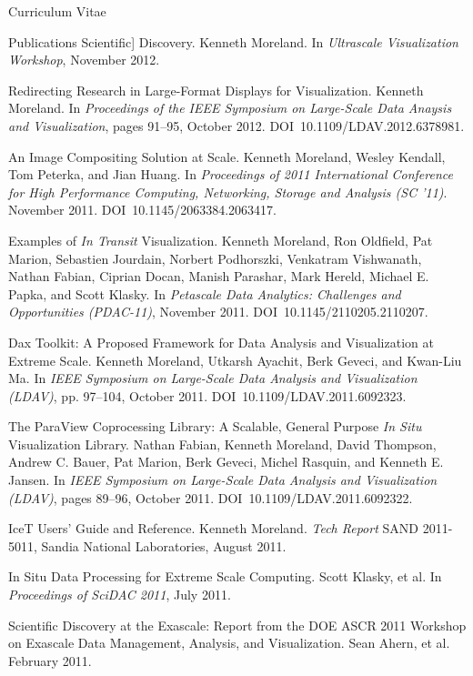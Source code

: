 \documentclass{article}
\begin{document}
\begin{cv}{Curriculum Vitae}
\begin{cvlist}{Publications}
      Scientific] Discovery.  Kenneth Moreland.  In \emph{Ultrascale
      Visualization Workshop}, November 2012.
    \item[Redirecting Research in Large-Format Displays for Visualization.]
      Kenneth Moreland. In \emph{Proceedings of the IEEE Symposium on
        Large-Scale Data Anaysis and Visualization}, pages 91--95, October
      2012. DOI~10.1109/LDAV.2012.6378981.
    \item[An Image Compositing Solution at Scale.] Kenneth Moreland, Wesley
      Kendall, Tom Peterka, and Jian Huang. In \emph{Proceedings of 2011
        International Conference for High Performance Computing,
        Networking, Storage and Analysis (SC '11)}. November
      2011. DOI~10.1145/2063384.2063417.
    \item[Examples of \emph{In Transit} Visualization.] Kenneth Moreland,
      Ron Oldfield, Pat Marion, Sebastien Jourdain, Norbert Podhorszki,
      Venkatram Vishwanath, Nathan Fabian, Ciprian Docan, Manish Parashar,
      Mark Hereld, Michael E. Papka, and Scott Klasky. In \emph{Petascale
        Data Analytics: Challenges and Opportunities (PDAC-11)}, November
      2011. DOI~10.1145/2110205.2110207.
    \item[Dax Toolkit: A Proposed Framework for Data Analysis and
      Visualization at] Extreme Scale. Kenneth Moreland, Utkarsh Ayachit,
      Berk Geveci, and Kwan-Liu Ma. In \emph{IEEE Symposium on Large-Scale
        Data Analysis and Visualization (LDAV)}, pp. 97--104, October
      2011. DOI~10.1109/LDAV.2011.6092323.
    \item[The ParaView Coprocessing Library: A Scalable, General Purpose
      \emph{In Situ}] Visualization Library. Nathan Fabian, Kenneth
      Moreland, David Thompson, Andrew C. Bauer, Pat Marion, Berk Geveci,
      Michel Rasquin, and Kenneth E. Jansen. In \emph{IEEE Symposium on
        Large-Scale Data Analysis and Visualization (LDAV)}, pages 89--96,
      October 2011. DOI~10.1109/LDAV.2011.6092322.
    \item[IceT Users' Guide and Reference.] Kenneth Moreland. \emph{Tech
      Report} SAND 2011-5011, Sandia National Laboratories, August 2011.
    \item[In Situ Data Processing for Extreme Scale Computing.] Scott
      Klasky, et al. In \emph{Proceedings of SciDAC 2011}, July 2011.
    \item[Scientific Discovery at the Exascale: Report from the DOE ASCR
      2011] Workshop on Exascale Data Management, Analysis, and
      Visualization. Sean Ahern, et al. February 2011.

\end{cvlist}
\end{cv}
\end{document}
